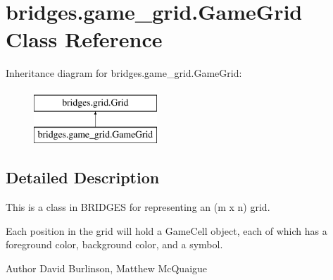 \hypertarget{classbridges_1_1game__grid_1_1_game_grid}{}\section{bridges.\+game\+\_\+grid.\+Game\+Grid Class Reference}
\label{classbridges_1_1game__grid_1_1_game_grid}
Inheritance diagram for bridges.\+game\+\_\+grid.\+Game\+Grid\+:\begin{figure}[H]
\begin{center}
\leavevmode
\includegraphics[height=2.000000cm]{classbridges_1_1game__grid_1_1_game_grid}
\end{center}
\end{figure}


\subsection{Detailed Description}
This is a class in B\+R\+I\+D\+G\+ES for representing an (m x n) grid. 

Each position in the grid will hold a Game\+Cell object, each of which has a foreground color, background color, and a symbol. \begin{DoxyAuthor}{Author}
David Burlinson, Matthew Mc\+Quaigue 
\end{DoxyAuthor}
